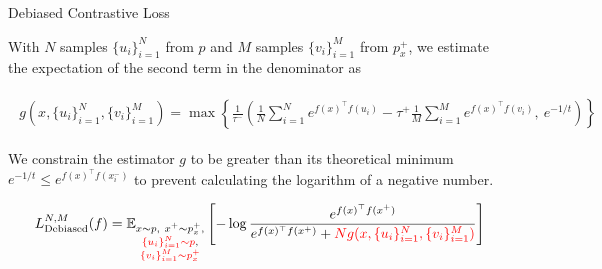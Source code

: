 \documentclass[aspectratio=169,mathserif]{beamer}  %
\newcommand{\E}{\mathbb{E}}
\newcommand{\red}{\textcolor{red}}
\begin{document}





    



\begin{frame}{Debiased Contrastive Loss}

With $N$ samples $\{u_i\}_{i=1}^N$ from $p$ and $M$ samples $\{v_i\}_{i=1}^M$ from $p_x^+$, we estimate the expectation of the second term in the denominator as

\begin{eqnarray}
\begin{aligned}
g(x,\{u_i\}_{i=1}^N,\{v_i\}_{i=1}^M)=\max\left\{\frac{1}{\tau^-}\left(\frac{1}{N}\sum_{i=1}^Ne^{f(x)^\top f(u_i)}-\tau^+\frac{1}{M}\sum_{i=1}^Me^{f(x)^\top f(v_i)},\ e^{-1/t}\right)\right\}
\end{aligned}
\end{eqnarray}

\pause

We constrain the estimator $g$ to be greater than its theoretical minimum $e^{-1/t}\leq e^{f(x)^\top f(x_i^-)}$ to prevent calculating the logarithm of a negative number.

\pause

\begin{eqnarray}
\begin{aligned}
L_{\text{Debiased}}^{N,M}(f)=\E_{\substack{x\sim p,\ x^+\sim p_x^+,\\ \red{\{u_i\}_{i=1}^N\sim p},\\ \red{\{v_i\}_{i=1}^M\sim p_x^+}}}\left[-\log \frac{e^{f(x)^\top f(x^+)}}{e^{f(x)^\top f(x^+)}+ \red{Ng(x,\{u_i\}_{i=1}^N,\{v_i\}_{i=1}^M)}} \right]
\end{aligned}
\end{eqnarray}

    
\end{frame}
\end{document}
